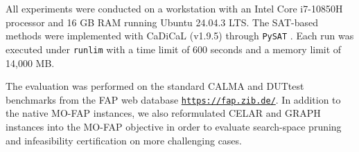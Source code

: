 \documentclass[letterpaper,journal]{IEEEtran}
\begin{document}

All experiments were conducted on a workstation with an Intel Core i7-10850H processor and 16 GB RAM running Ubuntu 24.04.3 LTS. The SAT-based methods were implemented with CaDiCaL (v1.9.5) through \texttt{PySAT} \cite{imms-sat18,itk-sat24}. Each run was executed under \texttt{runlim} with a time limit of 600 seconds and a memory limit of 14,000 MB.

The evaluation was performed on the standard CALMA and DUTtest benchmarks from the FAP web database \texttt{\url{https://fap.zib.de/}}. In addition to the native MO-FAP instances, we also reformulated CELAR and GRAPH instances into the MO-FAP objective in order to evaluate search-space pruning and infeasibility certification on more challenging cases. 
\end{document}
